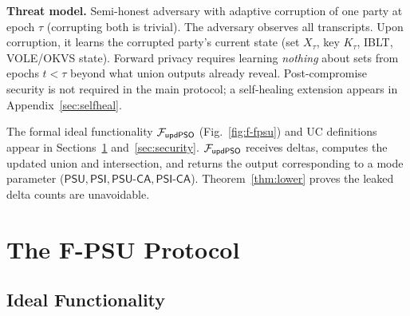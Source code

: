 \documentclass[letterpaper,twocolumn,10pt]{article}
\theoremstyle{definition}
\begin{document}
\textbf{Threat model.} Semi-honest adversary with adaptive corruption of one
party at epoch $\tau$ (corrupting both is trivial). The adversary observes all
transcripts. Upon corruption, it learns the corrupted party's current state
(set $X_\tau$, key $K_\tau$, IBLT, VOLE/OKVS state). Forward privacy requires
learning \emph{nothing} about sets from epochs $t < \tau$ beyond what union
outputs already reveal. Post-compromise security is not required in the main
protocol; a self-healing extension appears in Appendix~\ref{sec:selfheal}.

The formal ideal functionality $\mathcal{F}_{\mathsf{updPSO}}$
(Fig.~\ref{fig:f-fpsu}) and UC definitions appear in
Sections~\ref{sec:protocol} and~\ref{sec:security}.
$\mathcal{F}_{\mathsf{updPSO}}$ receives deltas, computes the updated union and
intersection, and returns the output corresponding to a mode parameter
($\mathsf{PSU}, \mathsf{PSI}, \mathsf{PSU}\text{-}\mathsf{CA},
\mathsf{PSI}\text{-}\mathsf{CA}$). Theorem~\ref{thm:lower} proves the
leaked delta counts are unavoidable.

\section{The F-PSU Protocol}
\label{sec:protocol}

\subsection{Ideal Functionality}
\end{document}
